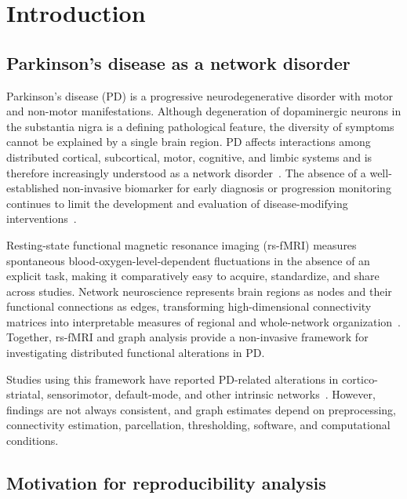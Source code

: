 \chapter{Introduction}
\label{chap:introduction}

\section{Parkinson's disease as a network disorder}

Parkinson's disease (PD) is a progressive neurodegenerative disorder with motor and non-motor manifestations. Although degeneration of dopaminergic neurons in the substantia nigra is a defining pathological feature, the diversity of symptoms cannot be explained by a single brain region. PD affects interactions among distributed cortical, subcortical, motor, cognitive, and limbic systems and is therefore increasingly understood as a network disorder~\cite{Li-Chuan2019Graphtheory,Akbari2023Graphtheory}. The absence of a well-established non-invasive biomarker for early diagnosis or progression monitoring continues to limit the development and evaluation of disease-modifying interventions~\cite{PPMI2011}.

Resting-state functional magnetic resonance imaging (rs-fMRI) measures spontaneous blood-oxygen-level-dependent fluctuations in the absence of an explicit task, making it comparatively easy to acquire, standardize, and share across studies. Network neuroscience represents brain regions as nodes and their functional connections as edges, transforming high-dimensional connectivity matrices into interpretable measures of regional and whole-network organization~\cite{Bullmore2009Complex,Wang2010Graph}. Together, rs-fMRI and graph analysis provide a non-invasive framework for investigating distributed functional alterations in PD.

Studies using this framework have reported PD-related alterations in cortico-striatal, sensorimotor, default-mode, and other intrinsic networks~\cite{Jinping2017Graphtheory,Rutvi2021Graphtheory,Akbari2023Graphtheory}. However, findings are not always consistent, and graph estimates depend on preprocessing, connectivity estimation, parcellation, thresholding, software, and computational conditions.

\section{Motivation for reproducibility analysis}

